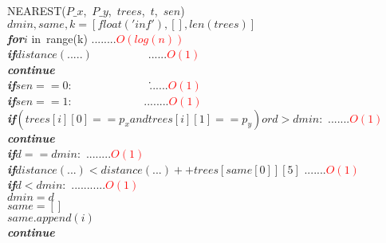\documentclass[30pt]{article}
\begin{document}
\begin{algorithm}
\end{algorithm}

\begin{algorithm}
NEAREST($P\_x$,\ $P\_y$,\ $trees$,\ $t$,\ $sen$)  \\
\hspace{1cm}$dmin,same,k = [float('inf'),[ ],len(trees)]$ \\
\hspace{1cm}\textbf{\textit{for}}$i $ in\ range(k)    ........\textcolor{red}{$O(log(n))$}\\
\hspace{1.7cm}\textbf{\textit{if}}$distance(.....)$\ \ \ \ \ \ \ \ \ \ ......\textcolor{red}{$O(1)$}\\
\hspace{1.8cm}  \textbf{\textit{continue}} \\
\hspace{1.7cm}\textbf{\textit{if}}$sen==0:$ \ \ \ \ \ \ \ \ \ \ \ \ \ \.......\textcolor{red}{$O(1)$} \\
\hspace{1.7cm}\textbf{\textit{if}}$sen==1:$ \ \ \ \ \ \ \ \ \ \ \ \ ........\textcolor{red}{$O(1)$} \\
\hspace{1.7cm}\textbf{\textit{if}}$(trees[i][0]==p_x and trees[i][1]==p_y) or d>dmin:$ .......\textcolor{red}{$O(1)$}\\
\hspace{1.8cm}  \textbf{\textit{continue}} \\   
\hspace{1.7cm}\textbf{\textit{if}}$d==dmin:$ ........\textcolor{red}{$O(1)$} \\
\hspace{1.9cm}  \textbf{\textit{if}}$distance(...)<distance(...)++trees[same[0]][5]$ .......\textcolor{red}{$O(1)$} \\ 
\hspace{1.7cm}\textbf{\textit{if}}$d<dmin:$ ...........\textcolor{red}{$O(1)$} \\
\hspace{1.9cm}$dmin = d$\\
\hspace{1.9cm}$same = []$\\
\hspace{1.9cm}$same.append(i)$\\
\hspace{1.9cm}\textbf{\textit{continue}}    
\end{algorithm} 
\end{document}
